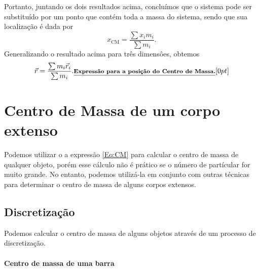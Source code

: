 Portanto, juntando os dois resultados acima, concluímos que o sistema pode ser substituído por um ponto que contém toda a massa do sistema, sendo que sua localização é dada por
\begin{equation}
  x_{\textrm{CM}} = \frac{\sum x_i m_i}{\sum m_i}.
\end{equation}
%
Generalizando o resultado acima para três dimensôes, obtemos
\begin{equation}\label{Eq:CM}
  \vec{r} = \frac{\sum m_i \vec{r}_i}{\sum m_i}. \relax{\footnotesize\emph{\textbf{Expressão para a posição do Centro de Massa.}}}[0pt]
\end{equation}

\section{Centro de Massa de um corpo extenso}

Podemos utilizar o a expressão \eqref{Eq:CM} para calcular o centro de massa de qualquer objeto, porém esse cálculo não é prático se o número de partícular for muito grande. No entanto, podemos utilizá-la em conjunto com outras técnicas para determinar o centro de massa de alguns corpos extensos.

\subsection{Discretização}

Podemos calcular o centro de massa de alguns objetos através de um processo de discretização. 

\paragraph{Centro de massa de uma barra}

